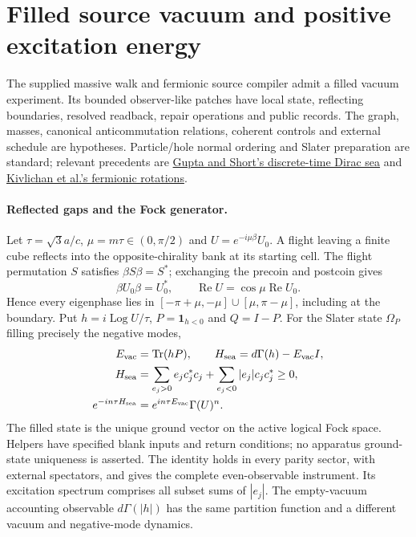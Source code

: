 \section{Filled source vacuum and positive excitation energy}
\label{app:filled-source-vacuum}

The supplied massive walk and fermionic source compiler admit a filled
vacuum experiment. Its bounded observer-like patches have local state,
reflecting boundaries, resolved readback, repair operations and public
records. The graph, masses, canonical anticommutation relations, coherent
controls and external schedule are hypotheses. Particle/hole normal ordering
and Slater preparation are standard; relevant precedents are
\href{https://arxiv.org/abs/2412.03466}{Gupta and Short's discrete-time Dirac sea}
and \href{https://arxiv.org/abs/1711.04789}{Kivlichan et al.'s fermionic rotations}.

\paragraph{Reflected gaps and the Fock generator.}
Let $\tau=\sqrt3a/c$, $\mu=m\tau\in(0,\pi/2)$ and
$U=e^{-i\mu\beta}U_0$. A flight leaving a finite cube reflects into the
opposite-chirality bank at its starting cell. The flight permutation $S$
satisfies $\beta S\beta=S^*$; exchanging the precoin and postcoin gives
\[
 \beta U_0\beta=U_0^*,\qquad \operatorname{Re}U=\cos\mu\operatorname{Re}U_0.
\]
Hence every eigenphase lies in
$[-\pi+\mu,-\mu]\cup[\mu,\pi-\mu]$, including at the boundary.
Put $h=i\operatorname{Log}U/\tau$, $P=\mathbf1_{h<0}$ and $Q=I-P$.
For the Slater state $\Omega_P$ filling precisely the negative modes,
\[
 \begin{split}
 E_{\rm vac}&=\operatorname{Tr}(hP),\qquad
 H_{\rm sea}=d\Gamma(h)-E_{\rm vac}I,\\
 H_{\rm sea}&=\sum_{e_j>0}e_jc_j^*c_j+
                  \sum_{e_j<0}|e_j|c_jc_j^*\ge0,\\
 e^{-in\tau H_{\rm sea}}&=e^{in\tau E_{\rm vac}}\Gamma(U)^n.
 \end{split}
\]
The filled state is the unique ground vector on the active logical Fock
space. Helpers have specified blank inputs and return conditions; no
apparatus ground-state uniqueness is asserted. The identity holds in every
parity sector, with external spectators, and gives the complete
even-observable instrument. Its excitation spectrum comprises all subset
sums of $|e_j|$. The empty-vacuum accounting observable $d\Gamma(|h|)$ has
the same partition function and a different vacuum and negative-mode dynamics.


